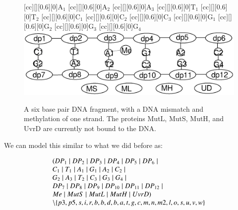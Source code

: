 \begin{figure}[h!]
[cc][][0.6][0]{${\mathrm{A_1}}$}
[cc][][0.6][0]{${\mathrm{A_2}}$}
[cc][][0.6][0]{${\mathrm{A_3}}$}
[cc][][0.6][0]{${\mathrm{T_1}}$}
[cc][][0.6][0]{${\mathrm{T_2}}$}
[cc][][0.6][0]{${\mathrm{C_1}}$}
[cc][][0.6][0]{${\mathrm{C_2}}$}
[cc][][0.6][0]{${\mathrm{C_3}}$}
[cc][][0.6][0]{${\mathrm{G_1}}$}
[cc][][0.6][0]{${\mathrm{G_2}}$}
[cc][][0.6][0]{${\mathrm{G_3}}$}
[cc][][0.6][0]{${\mathrm{G_4}}$}
  \centering
    \includegraphics[width=1.0\textwidth]{mmr/state1}
  \caption[A six base pair DNA fragment.]{A six base pair DNA fragment, with a DNA mismatch and methylation of one strand. The proteins MutL, MutS, MutH, and UvrD are currently not bound to the DNA.}
  \label{fig:state1}
\end{figure}

We can model this similar to what we did before as:

$$\begin{array}{l}
(DP_1 \; \vert \; DP_2 \; \vert \; DP_3 \; \vert \; DP_4 \; \vert \; DP_5 \; \vert \; DP_6 \; \vert \; \\
C_1 \; \vert \; T_1 \; \vert \; A_1 \; \vert \; G_1 \; \vert \; A_2 \; \vert \; C_2 \; \vert \; \\
G_2 \; \vert \; A_3 \; \vert \; T_2 \; \vert \; C_3 \; \vert \; G_3 \; \vert \; G_4 \; \vert \; \\
DP_7 \; \vert \; DP_8 \; \vert \; DP_9 \; \vert \; DP_{10} \; \vert \; DP_{11} \; \vert \; DP_{12} \; \vert \; \\
Me \; \vert \; MutS \; \vert \; MutL \; \vert \; MutH \; \vert \; UvrD) \\
\setminus\{p3, p5, s, i, r, b, b, d, b, a, t, g, c, m, n, m2, l, o, s, u, v, w\} 
\end{array}$$ 

